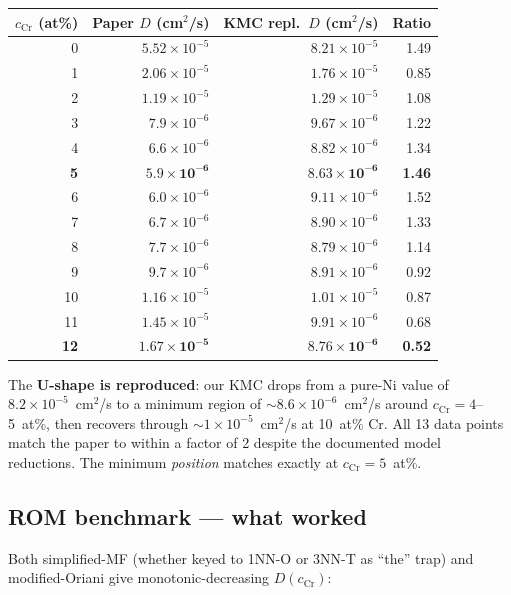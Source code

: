 \documentclass[11pt]{article}
\begin{document}
\begin{center}
\begin{tabular}{rrrr}
\toprule
$c_\text{Cr}$ (at\%) & Paper $D$ (cm$^2$/s) & KMC repl.\ $D$ (cm$^2$/s) & Ratio \\
\midrule
0  & $5.52\times 10^{-5}$ & $8.21\times 10^{-5}$ & 1.49 \\
1  & $2.06\times 10^{-5}$ & $1.76\times 10^{-5}$ & 0.85 \\
2  & $1.19\times 10^{-5}$ & $1.29\times 10^{-5}$ & 1.08 \\
3  & $7.9\times 10^{-6}$  & $9.67\times 10^{-6}$ & 1.22 \\
4  & $6.6\times 10^{-6}$  & $8.82\times 10^{-6}$ & 1.34 \\
\textbf{5}  & $\mathbf{5.9\times 10^{-6}}$  & $\mathbf{8.63\times 10^{-6}}$ & \textbf{1.46} \\
6  & $6.0\times 10^{-6}$  & $9.11\times 10^{-6}$ & 1.52 \\
7  & $6.7\times 10^{-6}$  & $8.90\times 10^{-6}$ & 1.33 \\
8  & $7.7\times 10^{-6}$  & $8.79\times 10^{-6}$ & 1.14 \\
9  & $9.7\times 10^{-6}$  & $8.91\times 10^{-6}$ & 0.92 \\
10 & $1.16\times 10^{-5}$ & $1.01\times 10^{-5}$ & 0.87 \\
11 & $1.45\times 10^{-5}$ & $9.91\times 10^{-6}$ & 0.68 \\
\textbf{12} & $\mathbf{1.67\times 10^{-5}}$ & $\mathbf{8.76\times 10^{-6}}$ & \textbf{0.52} \\
\bottomrule
\end{tabular}
\end{center}

The \textbf{U-shape is reproduced}: our KMC drops from a pure-Ni value
of $8.2\times 10^{-5}$~cm$^2$/s to a minimum region of $\sim 8.6 \times
10^{-6}$~cm$^2$/s around $c_\text{Cr} = 4$--5~at\%, then recovers
through $\sim 1 \times 10^{-5}$~cm$^2$/s at 10~at\% Cr.  All 13 data
points match the paper to within a factor of 2 despite the documented
model reductions.  The minimum \emph{position} matches exactly at
$c_\text{Cr} = 5$~at\%.

\subsection{ROM benchmark --- what worked}

Both simplified-MF (whether keyed to 1NN-O or 3NN-T as ``the'' trap)
and modified-Oriani give monotonic-decreasing $D(c_\text{Cr})$:
\end{document}
